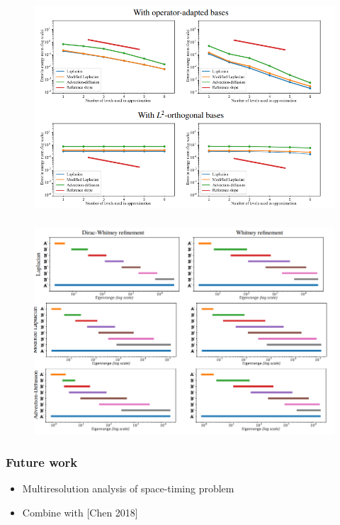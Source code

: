 \documentclass[serif,mathserif, 12pt]{beamer}
\begin{document}
\begin{frame}
  \frametitle{}
  \begin{figure}[t]
    \centering
    \includegraphics[width=\textwidth]{img/homo_effect}
  \end{figure}
\end{frame}

\begin{frame}
  \frametitle{}
  \begin{figure}[t]
    \centering
    \includegraphics[width=\textwidth]{img/eigen_range}
  \end{figure}
\end{frame}

\begin{frame}
  \frametitle{Future work}
  \begin{itemize}
  \item Multiresolution analysis of space-timing problem
  \item Combine with [Chen 2018]
  \end{itemize}
\end{frame}

\begin{frame} 
\end{frame}
\end{document}
